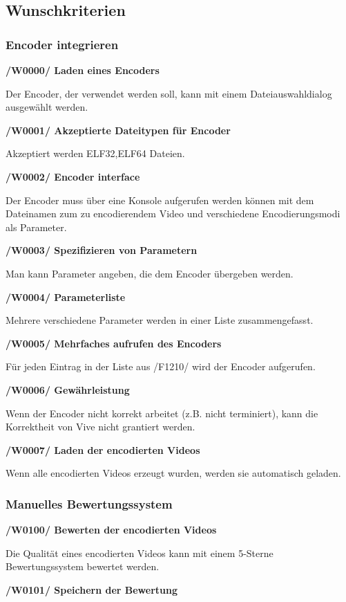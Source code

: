 \documentclass[parskip=full]{scrartcl}
\begin{document}
\subsection{Wunschkriterien}

\subsubsection{Encoder integrieren}
\textbf{/W0000/ Laden eines Encoders}

Der Encoder, der verwendet werden soll, kann mit einem Dateiauswahldialog ausgewählt werden.

\textbf{/W0001/ Akzeptierte Dateitypen für Encoder}

Akzeptiert werden ELF32,ELF64 Dateien.

\newpage
\textbf{/W0002/ Encoder interface}

Der Encoder muss über eine Konsole aufgerufen werden können mit dem Dateinamen zum zu encodierendem Video und verschiedene Encodierungsmodi als Parameter.

\textbf{/W0003/ Spezifizieren von Parametern}

Man kann Parameter angeben, die dem Encoder übergeben werden.

\textbf{/W0004/ Parameterliste}

Mehrere verschiedene Parameter werden in einer Liste zusammengefasst.

\textbf{/W0005/ Mehrfaches aufrufen des Encoders}

Für jeden Eintrag in der Liste aus /F1210/ wird der Encoder aufgerufen.

\textbf{/W0006/ Gewährleistung}

Wenn der Encoder nicht korrekt arbeitet (z.B. nicht terminiert), kann die Korrektheit von Vive nicht grantiert werden.

\textbf{/W0007/ Laden der encodierten Videos}

Wenn alle encodierten Videos erzeugt wurden, werden sie automatisch geladen.

\subsubsection{Manuelles Bewertungssystem}
\textbf{/W0100/ Bewerten der encodierten Videos}

Die Qualität eines encodierten Videos kann mit einem 5-Sterne Bewertungssystem bewertet werden.

\textbf{/W0101/ Speichern der Bewertung}
\end{document}
